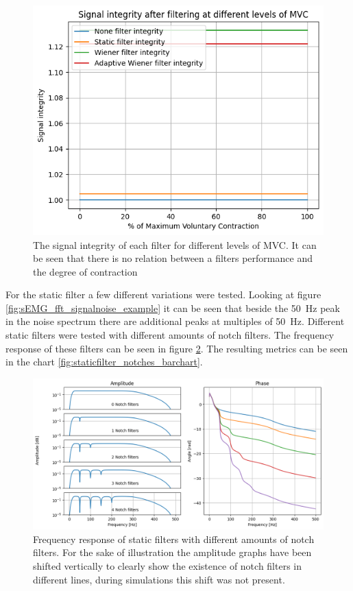 \begin{figure}[h!t]
	\begin{center}
		\includegraphics[width=0.7\columnwidth]{images/filter_signal_integrity_mvc.png}
	\end{center}
	\caption{The signal integrity of each filter for different levels of MVC. It can be seen that there is no relation between a filters performance and the degree of contraction}
	\label{fig:filter_signal_integrity_mvc}
\end{figure}

For the static filter a few different variations were tested. Looking at figure \ref{fig:sEMG_fft_signalnoise_example} it can be seen that beside the \SI{50}{\hertz} peak in the noise spectrum there are additional peaks at multiples of \SI{50}{\hertz}. Different static filters were tested with different amounts of notch filters. The frequency response of these filters can be seen in figure \ref{fig:staticfilter_notches_frequencyresponse}. The resulting metrics can be seen in the chart  \ref{fig:staticfilter_notches_barchart}.

\begin{figure}[h!t]
	\begin{center}
		\includegraphics[width=0.7\columnwidth]{images/staticfilter_notches_frequencyresponse.png}
	\end{center}
	\caption{Frequency response of static filters with different amounts of notch filters. For the sake of illustration the amplitude graphs have been shifted vertically to clearly show the existence of notch filters in different lines, during simulations this shift was not present. }
	\label{fig:staticfilter_notches_frequencyresponse}
\end{figure}

